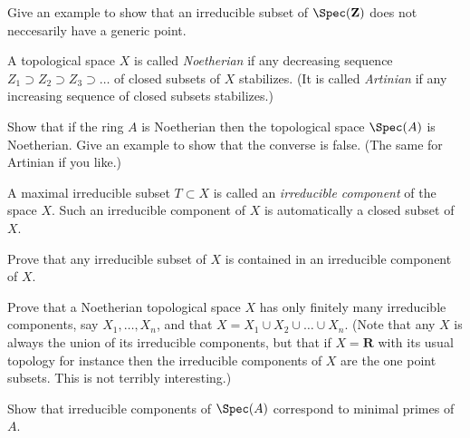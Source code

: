 \begin{exercise}
\label{exercise-irreducible-subset-not-generic}
Give an example to show that an irreducible
subset of $\Spec(\mathbf{Z})$ does not neccesarily have a generic point.
\end{exercise}

\begin{definition}
\label{definition-Noetherian-space}
A topological space $X$ is called {\it Noetherian} if any
decreasing sequence $Z_1\supset Z_2 \supset Z_3\supset \ldots$
of closed subsets of $X$ stabilizes.
(It is called {\it Artinian} if any increasing sequence of closed
subsets stabilizes.)
\end{definition}

\begin{exercise}
\label{exercise-Noetherian-spec}
Show that if the ring $A$ is Noetherian then
the topological space $\Spec(A)$ is Noetherian. Give an
example to show that the converse is false. (The same for
Artinian if you like.)
\end{exercise}

\begin{definition}
\label{definition-irreducible-component}
A maximal irreducible subset $T\subset X$ is called an
{\it irreducible component} of the space $X$. Such an irreducible
component of $X$ is automatically a closed subset of $X$.
\end{definition}

\begin{exercise}
\label{exercise-irreducible-in-irreducible}
Prove that any irreducible subset
of $X$ is contained in an irreducible component of $X$.
\end{exercise}

\begin{exercise}
\label{exercise-Noetherian-finite-nr-irreducible}
Prove that a Noetherian topological space $X$
has only finitely many irreducible components, say $X_1, \ldots, X_n$,
and that $X = X_1\cup X_2\cup\ldots\cup X_n$. (Note that
any $X$ is always the union of its irreducible components, but that
if $X = {\mathbf R}$ with its usual topology for instance then the irreducible
components of $X$ are the one point subsets. This is not
terribly interesting.)
\end{exercise}

\begin{exercise}
\label{exercise-irreducible-components-minimal-primes}
Show that irreducible components of $\Spec(A)$
correspond to minimal primes of $A$.
\end{exercise}

